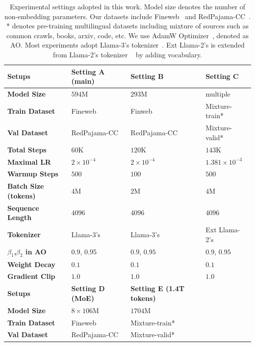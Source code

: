 \begin{table}[p]
\begin{center}
\caption{Experimental settings adopted in this work. Model size denotes the number of non-embedding parameters. Our datasets include Fineweb~\citep{penedo2024fineweb} and RedPajama-CC~\citep{together2023redpajama}. 
* denotes pre-training multilingual datasets including mixture of sources such as common crawls, books, arxiv, code, etc.
We use AdamW Optimizer~\citep{adam-optim,loshchilov2017decoupled}, denoted as AO.
Most experiments adopt Llama-3's tokenizer~\citep{dubey2024llama}.
Ext Llama-2's is extended from Llama-2's tokenizer ~\citep{touvron2023llama} by adding vocabulary.}
\label{tab:exp-sets}
\begin{tabular}{llll}
\toprule
\textbf{Setups} & \textbf{Setting A (main)} & \textbf{Setting B} & \textbf{Setting C}
\\
\midrule
\textbf{Model Size} & $594$M & $293$M & multiple \\
\textbf{Train Dataset} & Fineweb & Finweb & Mixture-train* \\ 
\textbf{Val Dataset} & RedPajama-CC & RedPajama-CC & Mixture-valid* \\
\textbf{Total Steps} & $60$K & $120$K & $143$K \\
\textbf{Maximal LR} & $2\times10^{-4}$ & $2\times10^{-4}$ & $1.381\times10^{-3}$ \\
\textbf{Warmup Steps} & $500$ & $100$ & $500$ \\
\textbf{Batch Size (tokens) } & $4$M & $2$M & $4$M \\
\textbf{Sequence Length} & $4096$ & $4096$ & $4096$ \\
\textbf{Tokenizer} & Llama-3's & Llama-3's & Ext Llama-2's \\
\textbf{$\beta_1$,$\beta_2$ in AO} & $0.9$, $0.9$5 &  $0.9$, $0.95$ & $0.9$, $0.95$\\
\textbf{Weight Decay}  & $0.1$ & $0.1$ & $0.1$\\
\textbf{Gradient Clip}  & $1.0$ & $1.0$ & $1.0$\\
\bottomrule  %
\toprule
\textbf{Setups} & \textbf{Setting D (MoE)} & \textbf{Setting E (1.4T tokens)} &  \\
\midrule 
\textbf{Model Size} & $8\times106$M & $1704$M &  \\
\textbf{Train Dataset} & Fineweb & Mixture-train* &  \\ 
\textbf{Val Dataset} & RedPajama-CC & Mixture-valid* &  \\

\end{tabular}
\end{center}
\end{table}
